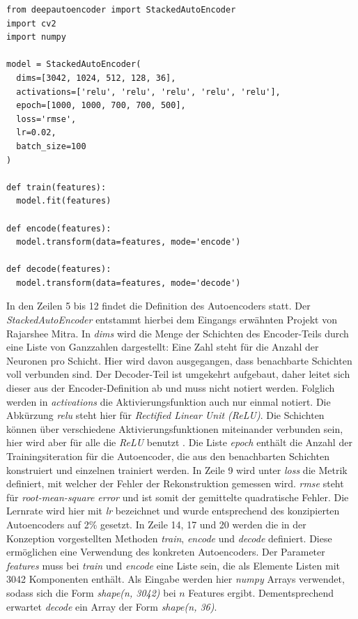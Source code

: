 \lstset{language=Python}
\begin{lstlisting}
from deepautoencoder import StackedAutoEncoder
import cv2
import numpy

model = StackedAutoEncoder(
  dims=[3042, 1024, 512, 128, 36],
  activations=['relu', 'relu', 'relu', 'relu', 'relu'], 
  epoch=[1000, 1000, 700, 700, 500], 
  loss='rmse', 
  lr=0.02, 
  batch_size=100
)

def train(features):
  model.fit(features)

def encode(features):
  model.transform(data=features, mode='encode')
  
def decode(features):
  model.transform(data=features, mode='decode')
\end{lstlisting}

In den Zeilen 5 bis 12 findet die Definition des Autoencoders statt. Der \textit{StackedAutoEncoder} entstammt hierbei dem Eingangs erwähnten Projekt von Rajarshee Mitra. In \textit{dims} wird die Menge der Schichten des Encoder-Teils durch eine Liste von Ganzzahlen dargestellt: Eine Zahl steht für die Anzahl der Neuronen pro Schicht. Hier wird davon ausgegangen, dass benachbarte Schichten voll verbunden sind. Der Decoder-Teil ist umgekehrt aufgebaut, daher leitet sich dieser aus der Encoder-Definition ab und muss nicht notiert werden. Folglich werden in \textit{activations} die Aktivierungsfunktion auch nur einmal notiert. 
Die Abkürzung \textit{relu} steht hier für \textit{Rectified Linear Unit (ReLU)}. Die Schichten können über verschiedene Aktivierungsfunktionen miteinander verbunden sein, hier wird aber für alle die \textit{ReLU} benutzt .
Die Liste \textit{epoch} enthält die Anzahl der Trainingsiteration für die Autoencoder, die aus den benachbarten Schichten konstruiert und einzelnen trainiert werden. In Zeile 9 wird unter \textit{loss} die Metrik definiert, mit welcher der Fehler der Rekonstruktion gemessen wird. \textit{rmse} steht für \textit{root-mean-square error} und ist somit der gemittelte quadratische Fehler. 
Die Lernrate wird hier mit \textit{lr} bezeichnet und wurde entsprechend des konzipierten Autoencoders auf 2\% gesetzt.\newline
In Zeile 14, 17 und 20 werden die in der Konzeption vorgestellten Methoden \textit{train}, \textit{encode} und \textit{decode} definiert. Diese ermöglichen eine Verwendung des konkreten Autoencoders. Der Parameter \textit{features} muss bei \textit{train} und \textit{encode} eine Liste sein, die als Elemente Listen mit 3042 Komponenten enthält. Als Eingabe werden hier \textit{numpy} Arrays verwendet, sodass sich die Form \textit{shape(n, 3042)} bei $n$ Features ergibt. Dementsprechend erwartet \textit{decode} ein Array der Form \textit{shape(n, 36)}.\newline

